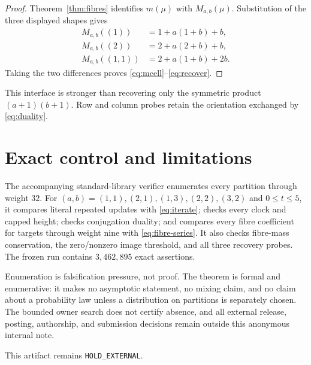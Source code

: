 \documentclass[a4paper,10pt]{amsart}
\theoremstyle{remark}
\begin{document}
\begin{proof}
Theorem~\ref{thm:fibres} identifies $m(\mu)$ with $M_{a,b}(\mu)$.
Substitution of the three displayed shapes gives
\begin{align*}
 M_{a,b}((1))&=1+a(1+b)+b,\\
 M_{a,b}((2))&=2+a(2+b)+b,\\
 M_{a,b}((1,1))&=2+a(1+b)+2b.
\end{align*}
Taking the two differences proves \eqref{eq:mcell}--\eqref{eq:recover}.
\end{proof}

This interface is stronger than recovering only the symmetric product
$(a+1)(b+1)$.  Row and column probes retain the orientation exchanged by
\eqref{eq:duality}.

\section{Exact control and limitations}\label{sec:control}

The accompanying standard-library verifier enumerates every partition through
weight $32$.  For $(a,b)=(1,1),(2,1),(1,3),(2,2),(3,2)$ and
$0\leq t\leq5$, it compares literal repeated updates with
\eqref{eq:iterate}; checks every clock and capped height; checks conjugation
duality; and compares every fibre coefficient for targets through weight nine
with \eqref{eq:fibre-series}.  It also checks fibre-mass conservation, the
zero/nonzero image threshold, and all three recovery probes.  The frozen run
contains $3{,}462{,}895$ exact assertions.

Enumeration is falsification pressure, not proof.  The theorem is formal and
enumerative: it makes no asymptotic statement, no mixing claim, and no claim
about a probability law unless a distribution on partitions is separately
chosen.  The bounded owner search does not certify absence, and all external
release, posting, authorship, and submission decisions remain outside this
anonymous internal note.

This artifact remains \texttt{HOLD\_EXTERNAL}.



\end{document}
